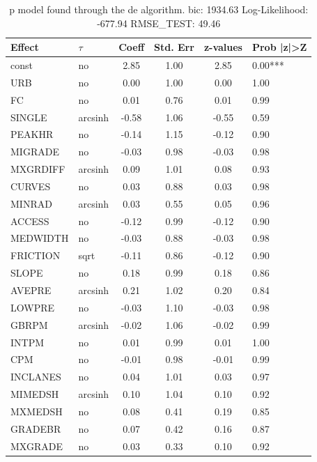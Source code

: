 \begin{table}
	\caption{p model found through the de algorithm. bic: 1934.63 Log-Likelihood: -677.94 RMSE_TEST: 49.46}
	\begin{center}
		\begin{tabular}{|l|l|c|c|c|l|}
			\hline
			Effect & $\tau$ & Coeff & Std. Err & z-values & Prob |z|>Z \\
			\hline
			const & no & 2.85 & 1.00 & 2.85 & 0.00*** \\
			\hline
			URB & no & 0.00 & 1.00 & 0.00 & 1.00 \\
			\hline
			FC & no & 0.01 & 0.76 & 0.01 & 0.99 \\
			\hline
			SINGLE & arcsinh & -0.58 & 1.06 & -0.55 & 0.59 \\
			\hline
			PEAKHR & no & -0.14 & 1.15 & -0.12 & 0.90 \\
			\hline
			MIGRADE & no & -0.03 & 0.98 & -0.03 & 0.98 \\
			\hline
			MXGRDIFF & arcsinh & 0.09 & 1.01 & 0.08 & 0.93 \\
			\hline
			CURVES & no & 0.03 & 0.88 & 0.03 & 0.98 \\
			\hline
			MINRAD & arcsinh & 0.03 & 0.55 & 0.05 & 0.96 \\
			\hline
			ACCESS & no & -0.12 & 0.99 & -0.12 & 0.90 \\
			\hline
			MEDWIDTH & no & -0.03 & 0.88 & -0.03 & 0.98 \\
			\hline
			FRICTION & sqrt & -0.11 & 0.86 & -0.12 & 0.90 \\
			\hline
			SLOPE & no & 0.18 & 0.99 & 0.18 & 0.86 \\
			\hline
			AVEPRE & arcsinh & 0.21 & 1.02 & 0.20 & 0.84 \\
			\hline
			LOWPRE & no & -0.03 & 1.10 & -0.03 & 0.98 \\
			\hline
			GBRPM & arcsinh & -0.02 & 1.06 & -0.02 & 0.99 \\
			\hline
			INTPM & no & 0.01 & 0.99 & 0.01 & 1.00 \\
			\hline
			CPM & no & -0.01 & 0.98 & -0.01 & 0.99 \\
			\hline
			INCLANES & no & 0.04 & 1.01 & 0.03 & 0.97 \\
			\hline
			MIMEDSH & arcsinh & 0.10 & 1.04 & 0.10 & 0.92 \\
			\hline
			MXMEDSH & no & 0.08 & 0.41 & 0.19 & 0.85 \\
			\hline
			GRADEBR & no & 0.07 & 0.42 & 0.16 & 0.87 \\
			\hline
			MXGRADE & no & 0.03 & 0.33 & 0.10 & 0.92 \\

\end{tabular}
\end{center}
\end{table}
